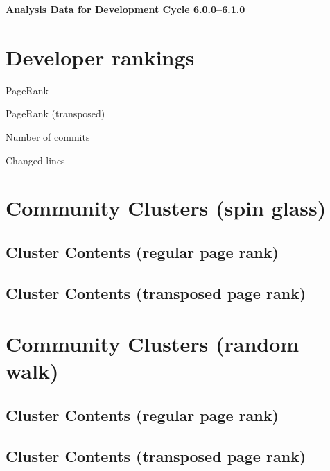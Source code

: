 \documentclass{article}
\begin{document}
\setlength{\parindent}{0pt}
\begin{center}
\begin{Large}
\textbf{Analysis Data for Development Cycle 6.0.0--6.1.0}
\end{Large}
\end{center}
\section{Developer rankings}
\begin{small}\renewcommand{\tabcolsep}{1pt}
\begin{minipage}{0.5\linewidth}
PageRank\\

\end{minipage}%
\begin{minipage}{0.5\linewidth}
PageRank (transposed)\\

\end{minipage}

\renewcommand{\tabcolsep}{5pt}
\begin{minipage}{0.5\linewidth}
Number of commits\\

\end{minipage}%
\begin{minipage}{0.5\linewidth}
Changed lines\\

\end{minipage}
\end{small}
\newpage\section{Community Clusters (spin glass)}
\subsection{Cluster Contents (regular page rank)}
\newpage\subsection{Cluster Contents (transposed page rank)}
\newpage\section{Community Clusters (random walk)}
\subsection{Cluster Contents (regular page rank)}
\newpage\subsection{Cluster Contents (transposed page rank)}
\end{document}
